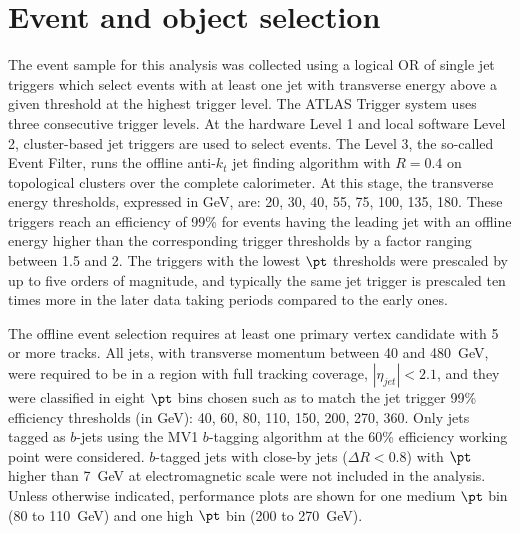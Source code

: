\section{Event and object selection}\label{sec:EventSelection}


The event sample for this analysis was collected  using a logical OR of single jet triggers which select events with at least one jet with transverse energy above a given threshold at the highest trigger level. The ATLAS Trigger system uses three consecutive trigger levels. At the hardware Level 1 and local software Level 2, cluster-based jet triggers are used to select events. The Level 3, the so-called Event Filter, runs  the offline anti-$k_t$ jet finding algorithm with $R = 0.4$ on topological clusters over the complete calorimeter.  At this stage, the transverse energy thresholds, expressed in GeV, are: 20, 30, 40, 55, 75, 100, 135, 180. These triggers reach an efficiency of 99\% for events having the leading jet with an offline energy higher than the corresponding trigger thresholds by a factor ranging between 1.5 and 2. The triggers with the lowest $\pt$ thresholds were prescaled by up to five orders of magnitude, and typically the same jet trigger is prescaled ten times more in the later data taking periods compared to the early ones. %



The offline event selection requires at least one primary vertex candidate with 5 or more tracks. All jets, with transverse momentum between 40 and 480~GeV,  %
were required to be in a region with full tracking coverage, $|\eta_{jet}|<2.1$, and they were classified in eight $\pt$ bins chosen such as to match the jet trigger 99\% efficiency thresholds (in GeV): 40, 60, 80, 110, 150, 200, 270, 360.  %
 Only jets tagged as $b$-jets using the MV1 $b$-tagging algorithm at the 60\% efficiency working point were considered. $b$-tagged jets with close-by jets ($\Delta R < 0.8$) with $\pt$ higher than 7~GeV at electromagnetic scale were not included in the analysis. Unless otherwise indicated, performance plots are shown for one medium  $\pt$ bin (80 to 110~GeV) and one high $\pt$ bin (200 to 270~GeV).


